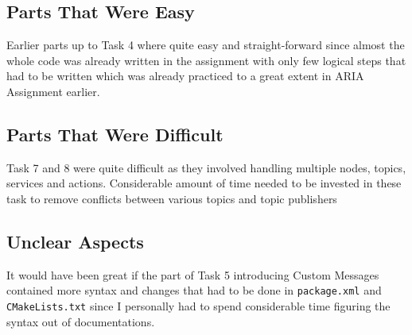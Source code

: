 \documentclass[12pt,a4paper]{article}
\begin{document}
\subsection{Parts That Were Easy}
Earlier parts up to Task 4 where quite easy and straight-forward since almost the whole code was already written in the assignment with only few logical steps that had to be written which was already practiced to a great extent in ARIA Assignment earlier.

\subsection{Parts That Were Difficult}
Task 7 and 8 were quite difficult as they involved handling multiple nodes, topics, services and actions. Considerable amount of time needed to be invested in these task to remove conflicts between various topics and topic publishers

\subsection{Unclear Aspects}
It would have been great if the part of Task 5 introducing Custom Messages contained more syntax and changes that had to be done in \texttt{package.xml} and \texttt{CMakeLists.txt} since I personally had to spend considerable time figuring the syntax out of documentations. 
\end{document}
